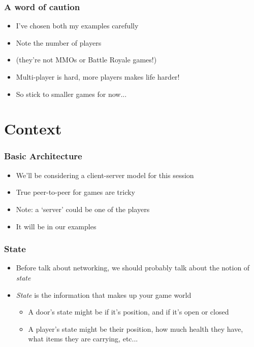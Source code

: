 \begin{frame}
	\frametitle{A word of caution}
	
	\begin{itemize}
		\item I've chosen both my examples carefully
		\item Note the number of players
		\item (they're not MMOs or Battle Royale games!)
		\item Multi-player is hard, more players makes life harder!
		\item So stick to smaller games for now...
	\end{itemize}
	
\end{frame}

\section{Context}

\begin{frame}
	\frametitle{Basic Architecture}
	
	\begin{itemize}
		\item We'll be considering a client-server model for this session
		\item True peer-to-peer for games are tricky
		\item Note: a `server' could be one of the players
		\item It will be in our examples
	\end{itemize}
	
\end{frame}

\begin{frame}
	\frametitle{State}
	
	\begin{itemize}
		\item Before talk about networking, we should probably talk about the notion of \textit{state}
		\item \textit{State} is the information that makes up your game world \begin{itemize}
			\item A door's state might be if it's position, and if it's open or closed
			\item A player's state might be their position, how much health they have, what items they are carrying, etc...
		\end{itemize}
	\end{itemize}
\end{frame}


